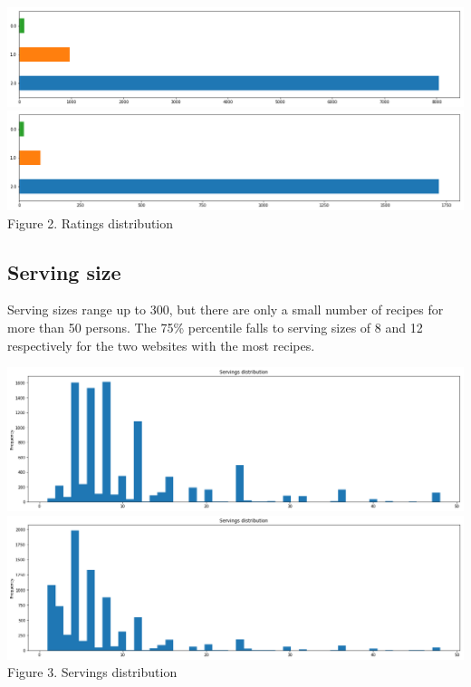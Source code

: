 \documentclass[11pt]{article}
\begin{document}
\vspace{5mm}
\begin{center}
\includegraphics[scale=0.085]{ratings-1}
\includegraphics[scale=0.085]{ratings-2}
\label{visalization-ratings} Figure 2. Ratings distribution
\end{center}
\vspace{5mm}

\subsection{Serving size}

Serving sizes range up to 300, but there are only a small number of recipes for more than 50 persons. The 75\% percentile falls to serving sizes of 8 and 12 respectively for the two websites with the most recipes. 

\vspace{5mm}
\begin{center}
\includegraphics[scale=0.085]{servings-1}
\includegraphics[scale=0.085]{servings-2}
\label{visalization-servings} Figure 3. Servings distribution
\end{center}
\vspace{5mm}
\end{document}

